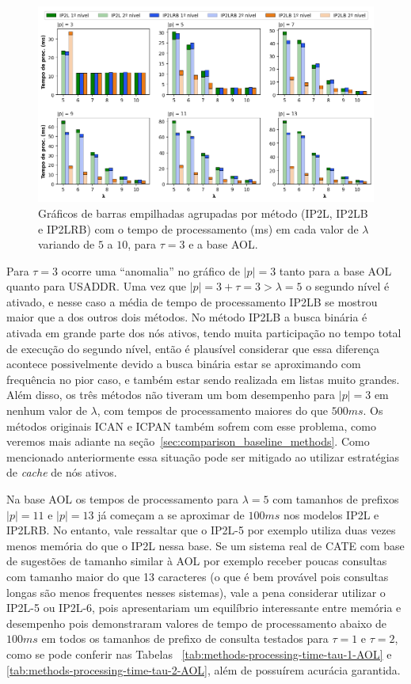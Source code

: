 \begin{figure} [h]
    \centering
    \includegraphics[width=1.0\textwidth]{figures/methods_processing_time_aol_3.png}
    \caption{Gráficos de barras empilhadas agrupadas por método (IP2L, IP2LB e IP2LRB) com o tempo de processamento (ms) em cada valor de $\lambda$ variando de $5$ a $10$, para $\tau=3$ e a base AOL.}
    \label{fig:methods_processing_time_aol_3}
\end{figure}

Para $\tau=3$ ocorre uma ``anomalia'' no gráfico de $|p|=3$ tanto para a base AOL quanto para USADDR. Uma vez que $|p|=3 + \tau=3 > \lambda=5$ o segundo nível é ativado, e nesse caso a média de tempo de processamento IP2LB se mostrou maior que a dos outros dois métodos. No método IP2LB a busca binária é ativada em grande parte dos nós ativos, tendo muita participação no tempo total de execução do segundo nível, então é plausível considerar que essa diferença acontece possivelmente devido a busca binária estar se aproximando com frequência no pior caso, e também estar sendo realizada em listas muito grandes. Além disso, os três métodos não tiveram um bom desempenho para $|p|=3$ em nenhum valor de $\lambda$, com tempos de processamento maiores do que $500ms$. Os métodos originais ICAN e ICPAN também sofrem com esse problema, como veremos mais adiante na seção~\ref{sec:comparison_baseline_methods}. Como mencionado anteriormente essa situação pode ser mitigado ao utilizar estratégias de \textit{cache} de nós ativos.

Na base AOL os tempos de processamento para $\lambda=5$ com tamanhos de prefixos $|p|=11$ e $|p|=13$ já começam a se aproximar de $100ms$ nos modelos IP2L e IP2LRB. No entanto, vale ressaltar que o IP2L-5 por exemplo utiliza duas vezes menos memória do que o IP2L nessa base. Se um sistema real de CATE com base de sugestões de tamanho similar à AOL por exemplo receber poucas consultas com tamanho maior do que 13 caracteres (o que é bem provável pois consultas longas são menos frequentes nesses sistemas), vale a pena considerar utilizar o IP2L-5 ou IP2L-6, pois apresentariam um equilíbrio interessante entre memória e desempenho pois demonstraram valores de tempo de processamento abaixo de $100ms$ em todos os tamanhos de prefixo de consulta testados para $\tau=1$ e $\tau=2$, como se pode conferir nas Tabelas ~\ref{tab:methods-processing-time-tau-1-AOL} e \ref{tab:methods-processing-time-tau-2-AOL}, além de possuírem acurácia garantida.

